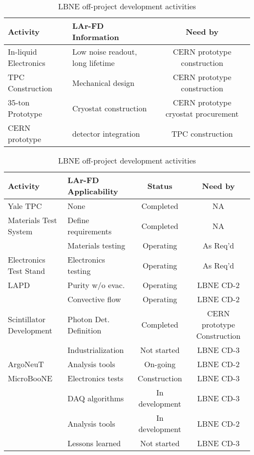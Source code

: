 \begin{table}
\begin{center}
\caption{LBNE on-project development activities}
\label{tab:on-project}
\begin{tabular}{| l | l | c |} \hline
Activity & LAr-FD Information & Need by \\ \hline \hline
In-liquid Electronics & Low noise readout, long lifetime & CERN prototype construction \\ \hline
TPC Construction & Mechanical design & CERN prototype construction \\ \hline
35-ton Prototype & Cryostat construction & CERN prototype cryostat procurement \\ \hline
CERN prototype & detector integration & TPC construction \\ \hline
\end{tabular}


\vspace{0.5 in}

\caption{LBNE off-project development activities}
\label{off-project}
\begin{tabular}{| l | l | c | c |} \hline
Activity & LAr-FD Applicability & Status & Need by \\ \hline \hline
Yale TPC & None & Completed  & NA \\ \hline
Materials Test System & Define requirements & Completed & NA \\
                              & Materials testing & Operating & As Req'd \\ \hline
Electronics Test Stand & Electronics testing & Operating & As Req'd \\ \hline
LAPD & Purity w/o evac. & Operating & LBNE CD-2 \\ \
        & Convective flow  & Operating &  LBNE CD-2 \\ \hline
Scintillator Development & Photon Det. Definition & Completed & CERN prototype Construction \\ 
                                   & Industrialization &  Not started & LBNE CD-3 \\ \hline
ArgoNeuT   & Analysis tools   &   On-going & LBNE CD-2 \\ \hline
MicroBooNE & Electronics tests & Construction & LBNE CD-3 \\ 
                  & DAQ algorithms &  In development & LBNE CD-3 \\
                  & Analysis tools    &  In development & LBNE CD-2 \\
                  & Lessons learned & Not started & LBNE CD-3 \\  \hline
\end{tabular}
\end{center}
\end{table}



